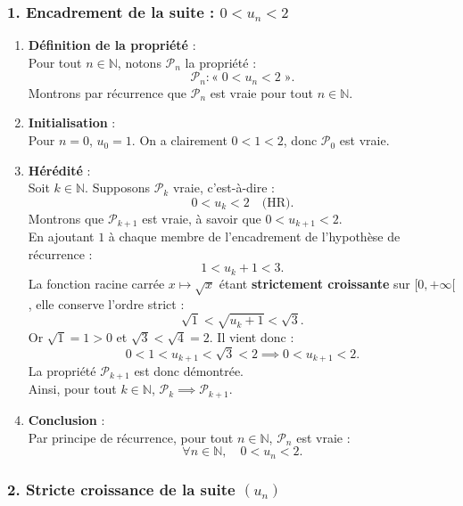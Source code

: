 \documentclass[11pt,a4paper]{article}
\newcommand{\N}{\mathbb{N}}
\begin{document}
\begin{correctionbox}
\subsubsection*{1. Encadrement de la suite : $0 < u_n < 2$}

\begin{enumerate}[label=\textbf{\arabic*.}]
    \item \textbf{Définition de la propriété} :\\
    Pour tout $n \in \N$, notons $\mathcal{P}_n$ la propriété :
    \[
    \mathcal{P}_n : « \; 0 < u_n < 2 \; ».
    \]
    Montrons par récurrence que $\mathcal{P}_n$ est vraie pour tout $n \in \N$.

    \item \textbf{Initialisation} :\\
    Pour $n = 0$, $u_0 = 1$. On a clairement $0 < 1 < 2$, donc $\mathcal{P}_0$ est vraie.

    \item \textbf{Hérédité} :\\
    Soit $k \in \N$. Supposons $\mathcal{P}_k$ vraie, c'est-à-dire :
    \[
    0 < u_k < 2 \quad \text{(HR)}.
    \]
    Montrons que $\mathcal{P}_{k+1}$ est vraie, à savoir que $0 < u_{k+1} < 2$.\\
    En ajoutant $1$ à chaque membre de l'encadrement de l'hypothèse de récurrence :
    \[
    1 < u_k + 1 < 3.
    \]
    La fonction racine carrée $x \mapsto \sqrt{x}$ étant \textbf{strictement croissante} sur $[0, +\infty[$, elle conserve l'ordre strict :
    \[
    \sqrt{1} < \sqrt{u_k + 1} < \sqrt{3}.
    \]
    Or $\sqrt{1} = 1 > 0$ et $\sqrt{3} < \sqrt{4} = 2$. Il vient donc :
    \[
    0 < 1 < u_{k+1} < \sqrt{3} < 2 \implies 0 < u_{k+1} < 2.
    \]
    La propriété $\mathcal{P}_{k+1}$ est donc démontrée.\\
    Ainsi, pour tout $k \in \N$, $\mathcal{P}_k \implies \mathcal{P}_{k+1}$.

    \item \textbf{Conclusion} :\\
    Par principe de récurrence, pour tout $n \in \N$, $\mathcal{P}_n$ est vraie :
    \[
    \forall n \in \N, \quad 0 < u_n < 2.
    \]
\end{enumerate}

\subsubsection*{2. Stricte croissance de la suite $(u_n)$}


\end{correctionbox}
\end{document}

